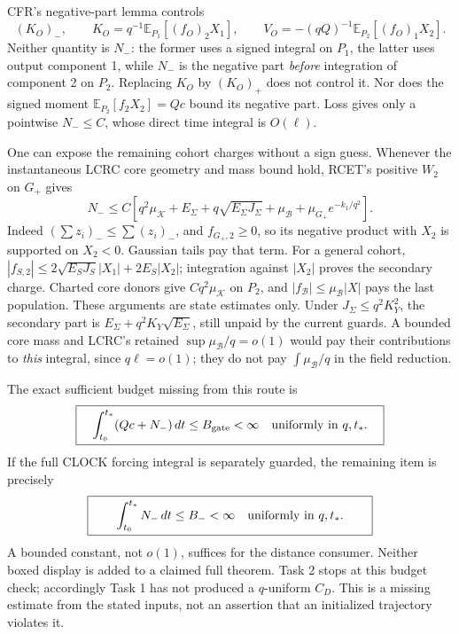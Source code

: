 \documentclass[11pt]{article}
\theoremstyle{remark}\newtheorem{remark}[proposition]{Remark}
\newcommand{\E}{\mathbb E}
\newcommand{\dd}{\,d}
\newcommand{\Gp}{G_+}
\begin{document}
CFR's negative-part lemma controls
\[
 (K_O)_-,\qquad K_O=q^{-1}\E_{P_1}[(f_O)_2X_1],
 \qquad V_O=-(qQ)^{-1}\E_{P_2}[(f_O)_1X_2].
\]
Neither quantity is $N_-$: the former uses a signed integral
on $P_1$, the latter uses output component 1, while $N_-$
is the negative part \emph{before} integration of component
2 on $P_2$. Replacing $K_O$ by $(K_O)_+$ does not control it.
Nor does the signed moment $\E_{P_2}[f_2X_2]=Qc$ bound its
negative part. Loss gives only a pointwise $N_-\le C$, whose
direct time integral is $O(\ell)$.

One can expose the remaining cohort charges without a sign
guess. Whenever the instantaneous LCRC core geometry and
mass bound hold, RCET's positive $W_2$ on $\Gp$ gives
\begin{equation}
 N_-\le C\left[
 q^2\mu_{\mathcal K}+E_\Sigma+q\sqrt{E_\Sigma J_\Sigma}
       +\mu_{\mathcal B}
       +\mu_{\Gp}e^{-k_1/q^2}\right].
 \label{an03gesgv1:Ncohorts}
\end{equation}
Indeed $(\sum z_i)_-\le\sum(z_i)_-$, and
$f_{\Gp,2}\ge0$, so its negative product with $X_2$ is
supported on $X_2<0$. Gaussian tails pay that term.
For a general cohort,
$|f_{S,2}|\le2\sqrt{E_SJ_S}|X_1|+2E_S|X_2|$;
integration against $|X_2|$ proves the secondary charge.
Charted core donors give $Cq^2\mu_{\mathcal K}$ on $P_2$,
and $|f_{\mathcal B}|\le\mu_{\mathcal B}|X|$ pays the last
population. These arguments are state estimates only.
Under $J_\Sigma\le q^2K_Y^2$, the secondary part is
$E_\Sigma+q^2K_Y\sqrt{E_\Sigma}$, still unpaid by the
current guards. A bounded core mass and LCRC's retained
$\sup\mu_{\mathcal B}/q=o(1)$ would pay their contributions
to \emph{this} integral, since $q\ell=o(1)$; they do not
pay $\int\mu_{\mathcal B}/q$ in the field reduction.

The exact sufficient budget missing from this route is
\begin{equation}
 \boxed{\quad
 \int_{t_0}^{t_*}(Qc+N_-)\dd t\le B_{\rm gate}<\infty
 \quad\hbox{uniformly in }q,t_* .\quad}
 \label{an03gesgv1:missing}
\end{equation}
If the full CLOCK forcing integral is separately guarded,
the remaining item is precisely
\begin{equation}
 \boxed{\qquad\int_{t_0}^{t_*}N_-\dd t\le B_-<\infty
       \quad\hbox{uniformly in }q,t_* .\qquad}
 \label{an03gesgv1:missingnegative}
\end{equation}
A bounded constant, not $o(1)$, suffices for the distance
consumer. Neither boxed display is added to a claimed full
theorem. Task 2 stops at this budget check; accordingly
Task 1 has not produced a $q$-uniform $C_D$.
This is a missing estimate from the stated inputs, not an
assertion that an initialized trajectory violates it.
\end{document}

